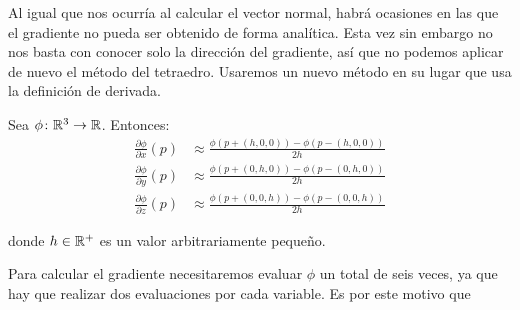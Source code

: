 Al igual que nos ocurría al calcular el vector normal, habrá ocasiones en las que el gradiente no pueda ser obtenido de forma analítica. Esta vez sin embargo no nos basta con conocer solo la dirección del gradiente, así que no podemos aplicar de nuevo el método del tetraedro. Usaremos un nuevo método en su lugar que usa la definición de derivada.

\begin{proposicion}
    Sea $\phi\colon \mathbb{R}^3\to\mathbb{R}$. Entonces:
    \begin{align*}
        \frac{\partial\phi}{\partial x}(p) &\approx \frac{\phi(p+(h,0,0)) - \phi(p-(h,0,0))}{2h}\\[10pt]
        \frac{\partial\phi}{\partial y}(p) &\approx \frac{\phi(p+(0,h,0)) - \phi(p-(0,h,0))}{2h}\\[10pt]
        \frac{\partial\phi}{\partial z}(p) &\approx \frac{\phi(p+(0,0,h)) - \phi(p-(0,0,h))}{2h}
    \end{align*}
    
    donde $h\in\mathbb{R}^+$ es un valor arbitrariamente pequeño. 
\end{proposicion}

Para calcular el gradiente necesitaremos evaluar $\phi$ un total de seis veces, ya que hay que realizar dos evaluaciones por cada variable. Es por este motivo que 




